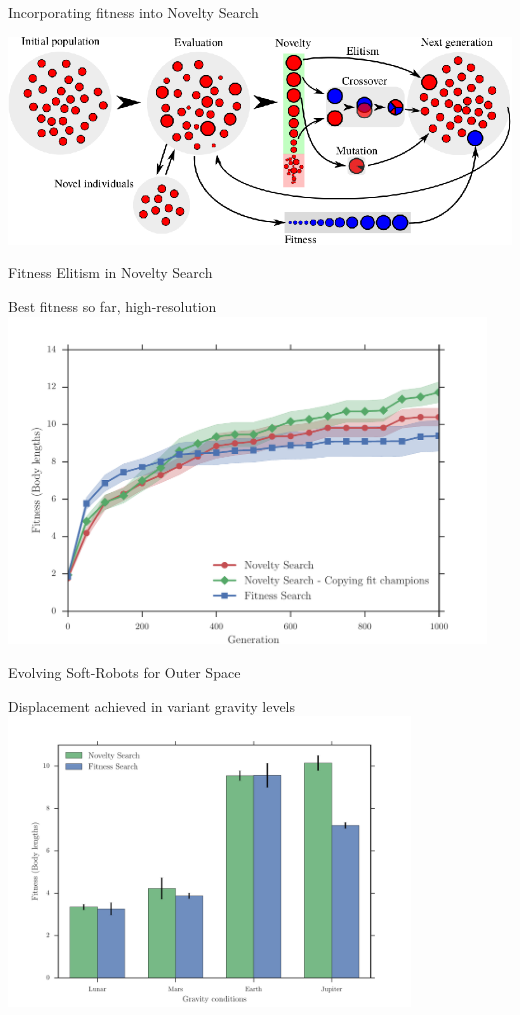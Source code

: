 \documentclass[6pt]{beamer}
\begin{document}
{\begin{frame}{Incorporating fitness into Novelty Search}
\begin{center}
\includegraphics[width=\textwidth]{../Figures/Misc/EvolutionNoveltyFitnessElitism.eps}
\end{center}
\end{frame}

\begin{frame}{Fitness Elitism in Novelty Search}
\begin{block}{Best fitness so far, high-resolution}
\centering
\includegraphics[width=0.95\textwidth]{../Figures/Results/CopyFitChampions10.pdf}
\end{block}
\end{frame}

\begin{frame}{Evolving Soft-Robots for Outer Space}
\begin{block}{Displacement achieved in variant gravity levels}
\centering
\includegraphics[width=0.8\textwidth]{../Figures/Results/GravityExperiment.pdf}
\end{block}
\end{frame}
}
\end{document}
